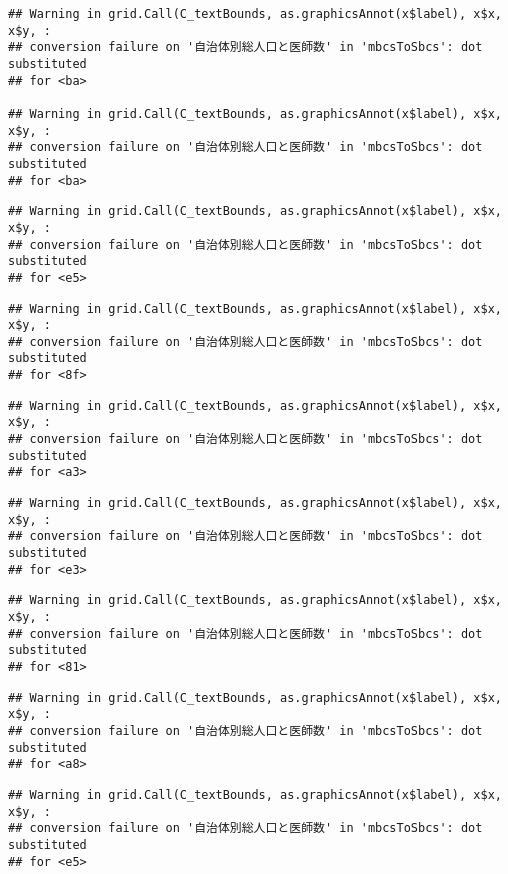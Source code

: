 \documentclass[
]{article}
\begin{document}
\begin{verbatim}
## Warning in grid.Call(C_textBounds, as.graphicsAnnot(x$label), x$x, x$y, :
## conversion failure on '自治体別総人口と医師数' in 'mbcsToSbcs': dot substituted
## for <ba>

## Warning in grid.Call(C_textBounds, as.graphicsAnnot(x$label), x$x, x$y, :
## conversion failure on '自治体別総人口と医師数' in 'mbcsToSbcs': dot substituted
## for <ba>
\end{verbatim}

\begin{verbatim}
## Warning in grid.Call(C_textBounds, as.graphicsAnnot(x$label), x$x, x$y, :
## conversion failure on '自治体別総人口と医師数' in 'mbcsToSbcs': dot substituted
## for <e5>
\end{verbatim}

\begin{verbatim}
## Warning in grid.Call(C_textBounds, as.graphicsAnnot(x$label), x$x, x$y, :
## conversion failure on '自治体別総人口と医師数' in 'mbcsToSbcs': dot substituted
## for <8f>
\end{verbatim}

\begin{verbatim}
## Warning in grid.Call(C_textBounds, as.graphicsAnnot(x$label), x$x, x$y, :
## conversion failure on '自治体別総人口と医師数' in 'mbcsToSbcs': dot substituted
## for <a3>
\end{verbatim}

\begin{verbatim}
## Warning in grid.Call(C_textBounds, as.graphicsAnnot(x$label), x$x, x$y, :
## conversion failure on '自治体別総人口と医師数' in 'mbcsToSbcs': dot substituted
## for <e3>
\end{verbatim}

\begin{verbatim}
## Warning in grid.Call(C_textBounds, as.graphicsAnnot(x$label), x$x, x$y, :
## conversion failure on '自治体別総人口と医師数' in 'mbcsToSbcs': dot substituted
## for <81>
\end{verbatim}

\begin{verbatim}
## Warning in grid.Call(C_textBounds, as.graphicsAnnot(x$label), x$x, x$y, :
## conversion failure on '自治体別総人口と医師数' in 'mbcsToSbcs': dot substituted
## for <a8>
\end{verbatim}

\begin{verbatim}
## Warning in grid.Call(C_textBounds, as.graphicsAnnot(x$label), x$x, x$y, :
## conversion failure on '自治体別総人口と医師数' in 'mbcsToSbcs': dot substituted
## for <e5>
\end{verbatim}
\end{document}
